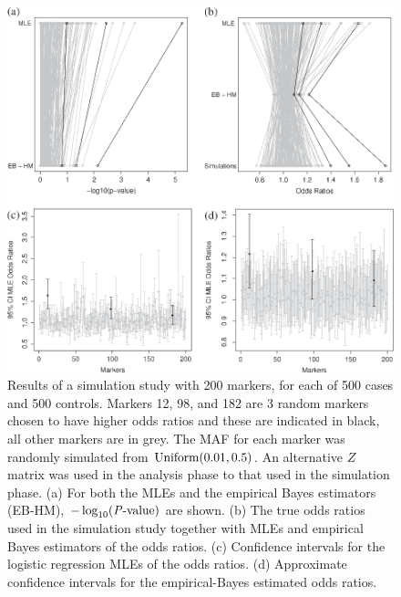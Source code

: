 \documentclass[oupdraft]{bio}
\begin{document}
\begin{figure}[!p]
\centering\includegraphics{fig2.eps}
\caption{Results of a simulation study with 200 markers,
for each of 500 cases and 500 controls. Markers 12, 98,
and 182 are 3 random markers chosen to have higher odds
ratios and these are indicated in black, all other
markers are in grey. The MAF for each marker was randomly
simulated from $\hbox{Uniform} (0.01, 0.5)$. An
alternative $Z$ matrix was used in the analysis phase
to that used in the simulation phase. (a) For both the
MLEs and the empirical Bayes estimators (EB-HM),
$-\log_{10} (\hbox{\textit{P}-value})$
are shown. (b) The true odds ratios used in the
simulation study together with MLEs and empirical Bayes
estimators of the odds ratios. (c) Confidence intervals
for the logistic regression MLEs of the odds ratios.
(d) Approximate confidence intervals for the empirical-Bayes
estimated odds ratios.}
\label{Fig2}
\end{figure}
\end{document}
